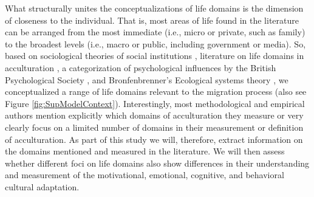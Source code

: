 \documentclass[man, 12pt, a4paper]{apa7}
\begin{document}
What structurally unites the conceptualizations of life domains is the dimension of closeness to the individual. That is, most areas of life found in the literature can be arranged from the most immediate (i.e., micro or private, such as family) to the broadest levels (i.e., macro or public, including government or media). So, based on sociological theories of social institutions \citep{Durkheim1982}, literature on life domains in acculturation \citep{Arends-Toth2006, Arends-Toth2007, Zane2004}, a categorization of psychological influences by the British Psychological Society \citep{Michie2005a}, and Bronfenbrenner's Ecological systems theory \citep{Bronfenbrenner1992}, we conceptualized a range of life domains relevant to the migration process (also see Figure \ref{fig:SupModelContext}). Interestingly, most methodological and empirical authors mention explicitly which domains of acculturation they measure or very clearly focus on a limited number of domains in their measurement or definition of acculturation. As part of this study we will, therefore, extract information on the domains mentioned and measured in the literature. We will then assess whether different foci on life domains also show differences in their understanding and measurement of the motivational, emotional, cognitive, and behavioral cultural adaptation.
\end{document}
